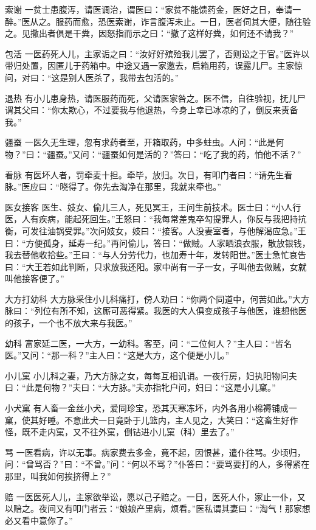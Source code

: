 \documentclass[12pt,UTF8]{ctexbook}
\begin{document}
索谢
一贫士患腹泻，请医调治，谓医曰：“家贫不能馈药金，医好之日，奉请一醉。”医从之。服药而愈，恐医索谢，诈言腹泻未止。一日，医者伺其大便，随往验之。见撒出者俱是干粪，因怒指而示之曰：“撤了这样好粪，如何还不请我？”

包活
一医药死人儿，主家诟之曰：“汝好好殡殓我儿罢了，否则讼之于官。”医许以带归处置，因匿儿于药箱中。中途又遇一家邀去，启箱用药，误露儿尸。主家惊问，对曰：“这是别人医杀了，我带去包活的。”

退热
有小儿患身热，请医服药而死，父请医家咎之。医不信，自往验视，抚儿尸谓其父曰：“你太欺心，不过要我与他退热，今身上幸已冰凉的了，倒反来责备我。”

疆蚕
一医久无生理，忽有求药者至，开箱取药，中多蛀虫。人问：“此是何物？”曰：“疆蚕。”又问：“疆蚕如何是活的？”答曰：“吃了我的药，怕他不活？”

看脉
有医坏人者，罚牵麦十担。牵毕，放归。次日，有叩门者曰：“请先生看脉。”医应曰：“晓得了。你先去淘净在那里，我就来牵也。”

医女接客
医生、妓女、偷儿三人，死见冥王，王问生前技术。医士曰：“小人行医，人有疾病，能起死回生。”王怒曰：“我每常差鬼卒勾提罪人，你反与我把持抗衡，可发往油锅受罪。”次问妓女，妓曰：“接客。人没妻室者，与他解渴应急。”王曰：“方便孤身，延寿一纪。”再问偷儿，答曰：“做贼。人家晒浪衣服，散放银钱，我去替他收拾些。”王曰：“与人分劳代力，也加寿十年，发转阳世。”医士急忙哀告曰：“大王若如此判断，只求放我还阳。家中尚有一子一女，子叫他去做贼，女就叫他接客便了。”

大方打幼科
大方脉采住小儿科痛打，傍人劝曰：“你两个同道中，何苦如此。”大方脉曰：“列位有所不知，这厮可恶得紧。我医的大人俱变成孩子与他医，谁想他医的孩子，一个也不放大来与我医。”

幼科
富家延二医，一大方，一幼科。客至，问：“二位何人？”主人曰：“皆名医。”又问：“那一科？”主人曰：“这是大方，这个便是小儿。”

小儿窠
小儿科之妻，乃大方脉之女，每每互相讥诮。一夜行房，妇执阳物问夫曰：“此是何物？”夫曰：“大方脉。”夫亦指牝户问，妇曰：“这是小儿窠。”

小犬窠
有人畜一金丝小犬，爱同珍宝，恐其天寒冻坏，内外各用小棉褥铺成一窠，使其好睡。不意此犬一日竟卧于儿篮内，主人见之，大笑曰：“这畜生好作怪，既不走内窠，又不往外窠，倒钻进小儿窠（科）里去了。”

骂
一医看病，许以无事。病家费去多金，竟不起，因恨甚，遣仆往骂。少顷归，问：“曾骂否？”曰：“不曾。”问：“何以不骂？”仆答曰：“要骂要打的人，多得紧在那里，叫我如何挨挤得上？”

赔
一医医死人儿，主家欲举讼，愿以己子赔之。一日，医死人仆，家止一仆，又以赔之。夜间又有叩门者云：“娘娘产里病，烦看。”医私谓其妻曰：“淘气！那家想必又看中意你了。”
\end{document}
